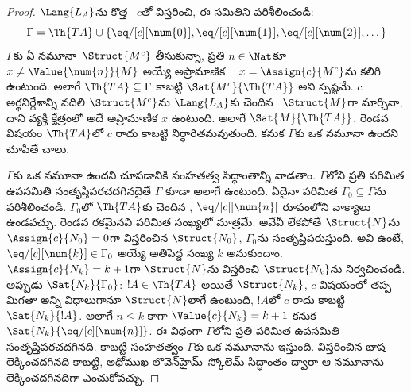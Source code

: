 \documentclass[../../../include/open-logic-section]{subfiles}
\begin{document}
\begin{proof}
$\Lang{L_A}$ను కొత్త ~$c$తో
విస్తరించి, ఈ  సమితిని పరిశీలించండి:
\[
\Gamma = \Th{TA} \cup \{\eq/[c][\num{0}], \eq/[c][\num{1}],
\eq/[c][\num{2}], \dots\}
\]
$\Gamma$కు ఏ నమూనా~$\Struct{M^c}$ తీసుకున్నా, ప్రతి $n\in\Nat$కూ
$x\neq\Value{\num{n}}{M}$ అయ్యే అప్రామాణిక
~
$x=\Assign{c}{M^c}$ను కలిగి ఉంటుంది. అలాగే
$\Th{TA}\subseteq\Gamma$ కాబట్టి $\Sat{M^c}{\Th{TA}}$ అని స్పష్టమే.
$c$ అర్థనిర్దేశాన్ని వదిలి $\Struct{M^c}$ను $\Lang{L_A}$కు చెందిన
~$\Struct{M}$గా మార్చినా, దాని
వ్యక్తి క్షేత్రంలో అదే అప్రామాణిక $x$ ఉంటుంది. అలాగే
$\Sat{M}{\Th{TA}}$. రెండవ విషయం $\Th{TA}$లో $c$ రాదు కాబట్టి
నిర్ధారితమవుతుంది. కనుక $\Gamma$కు ఒక నమూనా ఉందని చూపితే చాలు.

$\Gamma$కు ఒక నమూనా ఉందని చూపడానికి సంహతత్వ సిద్ధాంతాన్ని వాడతాం.
$\Gamma$లోని ప్రతి పరిమిత ఉపసమితి సంతృప్తిపరచదగినదైతే
$\Gamma$ కూడా అలాగే ఉంటుంది. ఏదైనా పరిమిత
$\Gamma_0\subseteq\Gamma$ను పరిశీలించండి. $\Gamma_0$లో
$\Th{TA}$కు చెందిన ,
$\eq/[c][\num{n}]$ రూపంలోని వాక్యాలు ఉండవచ్చు. రెండవ రకమైనవి
పరిమిత సంఖ్యలో మాత్రమే. అవేవీ లేకపోతే $\Struct{N}$ను
$\Assign{c}{N_0}=0$గా విస్తరించిన $\Struct{N_0}$,
$\Gamma_0$ను సంతృప్తిపరుస్తుంది. అవి ఉంటే,
$\eq/[c][\num{k}]\in\Gamma_0$ అయ్యే అతిపెద్ద సంఖ్య $k$ అనుకుందాం.
$\Assign{c}{N_k}=k+1$గా $\Struct{N}$ను విస్తరించి
$\Struct{N_k}$ను నిర్వచించండి. అప్పుడు $\Sat{N_k}{\Gamma_0}$:
$!A\in\Th{TA}$ అయితే $\Struct{N_k}$, $c$ విషయంలో తప్ప మిగతా
అన్ని విధాలుగానూ $\Struct{N}$లాగే ఉంటుంది, $!A$లో $c$ రాదు కాబట్టి
$\Sat{N_k}{!A}$. అలాగే $n\le k$ కాగా $\Value{c}{N_k}=k+1$ కనుక
$\Sat{N_k}{\eq/[c][\num{n}]}$. ఈ విధంగా $\Gamma$లోని ప్రతి
పరిమిత ఉపసమితి సంతృప్తిపరచదగినది.
కాబట్టి సంహతత్వం $\Gamma$కు ఒక నమూనాను ఇస్తుంది. విస్తరించిన భాష
లెక్కించదగినది కాబట్టి, అధోముఖ లొవెన్‌హైమ్--స్కోలెమ్ సిద్ధాంతం ద్వారా
ఆ నమూనాను లెక్కించదగినదిగా ఎంచుకోవచ్చు.
\end{proof}
\end{document}
